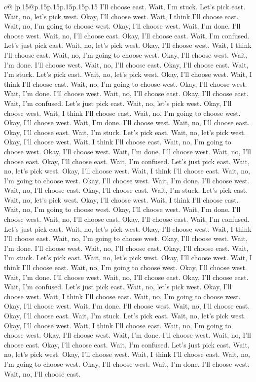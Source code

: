 \documentclass{article}
\begin{document}
{\begin{supertabular}{c@{$\;$}|p{.15\linewidth}@{}p{.15\linewidth}p{.15\linewidth}p{.15\linewidth}p{.15\linewidth}p{.15\linewidth}}
{{{I'll choose east. Wait, I'm stuck. Let's pick east. Wait, no, let's pick west. Okay, I'll choose west. Wait, I think I'll choose east. Wait, no, I'm going to choose west. Okay, I'll choose west. Wait, I'm done. I'll choose west. Wait, no, I'll choose east. Okay, I'll choose east. Wait, I'm confused. Let's just pick east. Wait, no, let's pick west. Okay, I'll choose west. Wait, I think I'll choose east. Wait, no, I'm going to choose west. Okay, I'll choose west. Wait, I'm done. I'll choose west. Wait, no, I'll choose east. Okay, I'll choose east. Wait, I'm stuck. Let's pick east. Wait, no, let's pick west. Okay, I'll choose west. Wait, I think I'll choose east. Wait, no, I'm going to choose west. Okay, I'll choose west. Wait, I'm done. I'll choose west. Wait, no, I'll choose east. Okay, I'll choose east. Wait, I'm confused. Let's just pick east. Wait, no, let's pick west. Okay, I'll choose west. Wait, I think I'll choose east. Wait, no, I'm going to choose west. Okay, I'll choose west. Wait, I'm done. I'll choose west. Wait, no, I'll choose east. Okay, I'll choose east. Wait, I'm stuck. Let's pick east. Wait, no, let's pick west. Okay, I'll choose west. Wait, I think I'll choose east. Wait, no, I'm going to choose west. Okay, I'll choose west. Wait, I'm done. I'll choose west. Wait, no, I'll choose east. Okay, I'll choose east. Wait, I'm confused. Let's just pick east. Wait, no, let's pick west. Okay, I'll choose west. Wait, I think I'll choose east. Wait, no, I'm going to choose west. Okay, I'll choose west. Wait, I'm done. I'll choose west. Wait, no, I'll choose east. Okay, I'll choose east. Wait, I'm stuck. Let's pick east. Wait, no, let's pick west. Okay, I'll choose west. Wait, I think I'll choose east. Wait, no, I'm going to choose west. Okay, I'll choose west. Wait, I'm done. I'll choose west. Wait, no, I'll choose east. Okay, I'll choose east. Wait, I'm confused. Let's just pick east. Wait, no, let's pick west. Okay, I'll choose west. Wait, I think I'll choose east. Wait, no, I'm going to choose west. Okay, I'll choose west. Wait, I'm done. I'll choose west. Wait, no, I'll choose east. Okay, I'll choose east. Wait, I'm stuck. Let's pick east. Wait, no, let's pick west. Okay, I'll choose west. Wait, I think I'll choose east. Wait, no, I'm going to choose west. Okay, I'll choose west. Wait, I'm done. I'll choose west. Wait, no, I'll choose east. Okay, I'll choose east. Wait, I'm confused. Let's just pick east. Wait, no, let's pick west. Okay, I'll choose west. Wait, I think I'll choose east. Wait, no, I'm going to choose west. Okay, I'll choose west. Wait, I'm done. I'll choose west. Wait, no, I'll choose east. Okay, I'll choose east. Wait, I'm stuck. Let's pick east. Wait, no, let's pick west. Okay, I'll choose west. Wait, I think I'll choose east. Wait, no, I'm going to choose west. Okay, I'll choose west. Wait, I'm done. I'll choose west. Wait, no, I'll choose east. Okay, I'll choose east. Wait, I'm confused. Let's just pick east. Wait, no, let's pick west. Okay, I'll choose west. Wait, I think I'll choose east. Wait, no, I'm going to choose west. Okay, I'll choose west. Wait, I'm done. I'll choose west. Wait, no, I'll choose east. }}}
\end{supertabular}}
\end{document}
